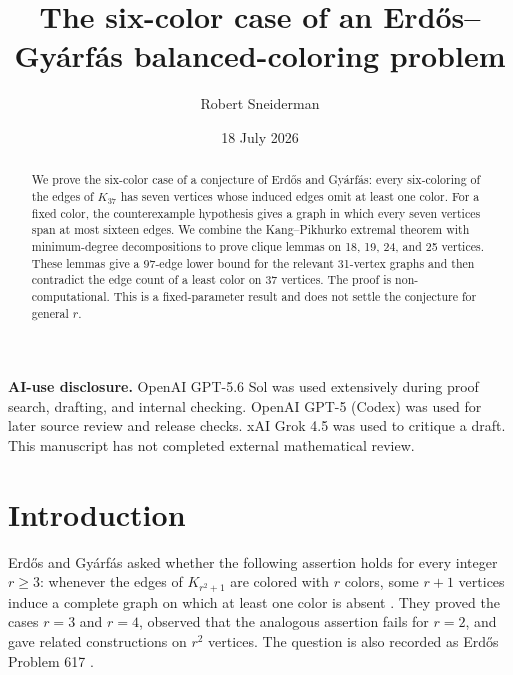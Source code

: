 \documentclass[11pt,reqno,a4paper]{amsart}
\title[The six-color case]{The six-color case of an Erd\H{o}s--Gy\'arf\'as balanced-coloring problem}
\author{Robert Sneiderman}
\date{18 July 2026}
\theoremstyle{definition}
\theoremstyle{remark}
\begin{document}

\begin{abstract}
We prove the six-color case of a conjecture of Erd\H{o}s and Gy\'arf\'as:
every six-coloring of the edges of $K_{37}$ has seven vertices whose induced
edges omit at least one color.  For a fixed color, the counterexample
hypothesis gives a graph in which every seven vertices span at most sixteen
edges.  We combine the Kang--Pikhurko extremal theorem with minimum-degree
decompositions to prove clique lemmas on 18, 19, 24, and 25 vertices.  These
lemmas give a 97-edge lower bound for the relevant 31-vertex graphs and then
contradict the edge count of a least color on 37 vertices.  The proof is
non-computational.  This is a fixed-parameter result and does not settle the
conjecture for general $r$.
\end{abstract}

\maketitle

\begin{center}
\end{center}

\medskip
\noindent\textbf{AI-use disclosure.}
OpenAI GPT-5.6 Sol was used extensively during proof search, drafting, and
internal checking. OpenAI GPT-5 (Codex) was used for later source review and
release checks. xAI Grok 4.5 was used to critique a draft. This manuscript
has not completed external mathematical review.
\medskip

\section{Introduction}

Erd\H{o}s and Gy\'arf\'as asked whether the following assertion holds for
every integer $r\geq3$: whenever the edges of $K_{r^2+1}$ are colored with
$r$ colors, some $r+1$ vertices induce a complete graph on which at least one
color is absent \cite{ErdosGyarfas1999}.  They proved the cases $r=3$ and
$r=4$, observed that the analogous assertion fails for $r=2$, and gave
related constructions on $r^2$ vertices.  The question is also recorded as
Erd\H{o}s Problem 617 \cite{ErdosProblems617}.
\end{document}
